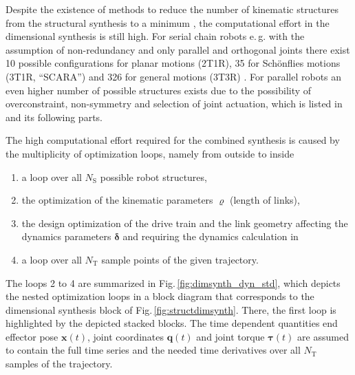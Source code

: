 \documentclass{svproc}
\newcommand{\bm}[1]{\boldsymbol{#1}}
\begin{document}

Despite the existence of methods to reduce the number of kinematic structures from the structural synthesis to a minimum \cite{RamirezKotOrt2015}, the computational effort in the dimensional synthesis is still high.
For serial chain robots e.\,g. with the assumption of non-redundancy and only parallel and orthogonal joints there exist 10 possible configurations for planar motions (2T1R), 35 for Schönflies motions (3T1R, ``SCARA'') and 326 for general motions (3T3R) \cite{RamirezKotOrt2015,RamirezKotOrt2017}.
For parallel robots an even higher number of possible structures exists due to the possibility of overconstraint, non-symmetry and selection of joint actuation, which is listed in \cite{Gogu2008} and its following parts.

The high computational effort required for the combined synthesis is caused by the multiplicity of optimization loops, namely from outside to inside
\begin{enumerate}
\item a loop over all $N_{\mathrm{S}}$ possible robot structures,
\item the optimization of the kinematic parameters $\bm{\varrho}$ (length of links),
\item the design optimization of the drive train and the link geometry affecting the dynamics parameters $\bm{\delta}$ and requiring the dynamics calculation in 
\item a loop over all $N_\mathrm{T}$ sample points of the given trajectory.
\end{enumerate}

The loops 2 to 4 are summarized in Fig.\,\ref{fig:dimsynth_dyn_std}, which depicts the nested optimization loops in a block diagram that corresponds to the dimensional synthesis block of Fig.\,\ref{fig:structdimsynth}.
There, the first loop is highlighted by the depicted stacked blocks.
The time dependent quantities end effector pose $\bm{x}(t)$, joint coordinates $\bm{q}(t)$ and joint torque $\bm{\tau}(t)$ are assumed to contain the full time series and the needed time derivatives over all $N_\mathrm{T}$ samples of the trajectory.
\end{document}
